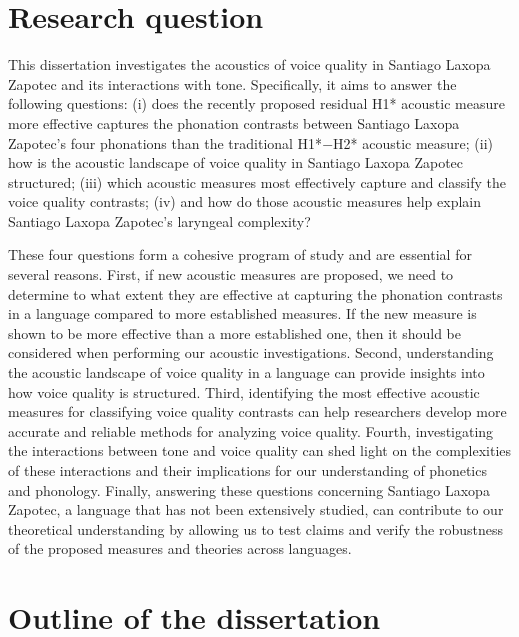 \section{Research question} \label{sec:research_question}

This dissertation investigates the acoustics of voice quality in Santiago Laxopa Zapotec and its interactions with tone. Specifically, it aims to answer the following questions: (i) does the recently proposed residual H1* acoustic measure more effective captures the phonation contrasts between Santiago Laxopa Zapotec's four phonations than the traditional H1*$-$H2* acoustic measure; (ii) how is the acoustic landscape of voice quality in Santiago Laxopa Zapotec structured; (iii) which acoustic measures most effectively capture and classify the voice quality contrasts; (iv) and how do those acoustic measures help explain Santiago Laxopa Zapotec's laryngeal complexity? 

These four questions form a cohesive program of study and are essential for several reasons. First, if new acoustic measures are proposed, we need to determine to what extent they are effective at capturing the phonation contrasts in a language compared to more established measures. If the new measure is shown to be more effective than a more established one, then it should be considered when performing our acoustic investigations. Second, understanding the acoustic landscape of voice quality in a language can provide insights into how voice quality is structured. Third, identifying the most effective acoustic measures for classifying voice quality contrasts can help researchers develop more accurate and reliable methods for analyzing voice quality. Fourth, investigating the interactions between tone and voice quality can shed light on the complexities of these interactions and their implications for our understanding of phonetics and phonology. Finally, answering these questions concerning Santiago Laxopa Zapotec, a language that has not been extensively studied, can contribute to our theoretical understanding by allowing us to test claims and verify the robustness of the proposed measures and theories across languages.

\section{Outline of the dissertation } \label{sec:conclusion}

